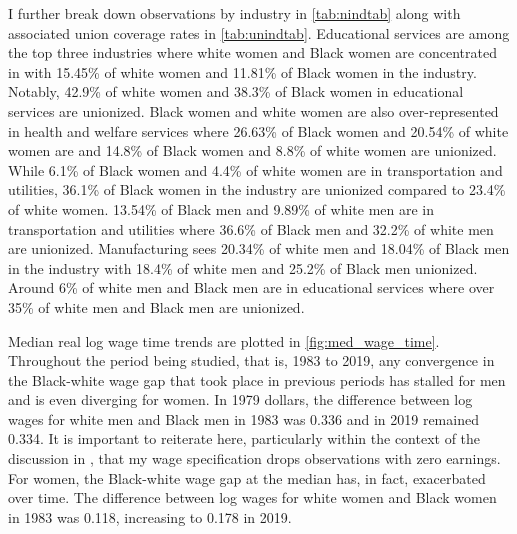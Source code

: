\documentclass[11pt]{article}
\begin{document}
I further break down observations by industry in \autoref{tab:nindtab} along with associated union coverage rates in \autoref{tab:unindtab}. Educational services are among the top three industries where white women and Black women are concentrated in with 15.45\% of white women and 11.81\% of Black women in the industry. Notably, 42.9\% of white women and 38.3\% of Black women in educational services are unionized. Black women and white women are also over-represented in health and welfare services where 26.63\% of Black women and 20.54\% of white women are and 14.8\% of Black women and 8.8\% of white women are unionized. While 6.1\% of Black women and 4.4\% of white women are in transportation and utilities, 36.1\% of Black women in the industry are unionized compared to 23.4\% of white women. 13.54\% of Black men and 9.89\% of white men are in transportation and utilities where 36.6\% of Black men and 32.2\% of white men are unionized. Manufacturing sees 20.34\% of white men and 18.04\% of Black men in the industry with 18.4\% of white men and 25.2\% of Black men unionized. Around 6\% of white men and Black men are in educational services where over 35\% of white men and Black men are unionized. 

Median real log wage time trends are plotted in \autoref{fig:med_wage_time}. Throughout the period being studied, that is, 1983 to 2019, any convergence in the Black-white wage gap that took place in previous periods has stalled for men and is even diverging for women. In 1979 dollars, the difference between log wages for white men and Black men in 1983 was 0.336 and in 2019 remained 0.334. It is important to reiterate here, particularly within the context of the discussion in \citet{bayercharles2018}, that my wage specification drops observations with zero earnings. For women, the Black-white wage gap at the median has, in fact, exacerbated over time. The difference between log wages for white women and Black women in 1983 was 0.118, increasing to 0.178 in 2019. 
\end{document}
